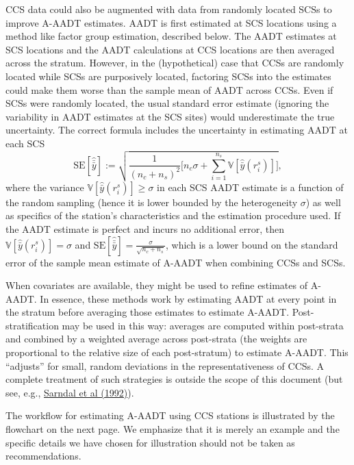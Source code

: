 \documentclass[11pt]{article}
\begin{document}
CCS data could also be augmented with data from randomly located SCSs to
improve A-AADT estimates. AADT is first estimated at SCS locations using
a method like factor group estimation, described below. The AADT
estimates at SCS locations and the AADT calculations at CCS locations
are then averaged across the stratum. However, in the (hypothetical)
case that CCSs are randomly located while SCSs are purposively located,
factoring SCSs into the estimates could make them worse than the sample
mean of AADT across CCSs. Even if SCSs were randomly located, the usual
standard error estimate (ignoring the variability in AADT estimates at
the SCS sites) would underestimate the true uncertainty. The correct
formula includes the uncertainty in estimating AADT at each SCS
\[\mbox{SE}[\hat{\bar{\bar{y}}}] := \sqrt{\frac{1}{(n_c + n_s)^2}\bigg [n_c \sigma + \sum_{i=1}^{n_s} \mathbb{V}[\hat{\bar{y}}(r_i^s)] \bigg ]},\]
where the variance \(\mathbb{V}[\hat{\bar{y}}(r_i^s)] \geq \sigma\) in
each SCS AADT estimate is a function of the random sampling (hence it is
lower bounded by the heterogeneity \(\sigma\)) as well as specifics of
the station's characteristics and the estimation procedure used. If the
AADT estimate is perfect and incurs no additional error, then
\(\mathbb{V}[\hat{\bar{y}}(r_i^s)] = \sigma\) and
\(\mbox{SE}[\hat{\bar{\bar{y}}}] = \frac{\sigma}{\sqrt{n_c + n_s}}\),
which is a lower bound on the standard error of the sample mean estimate
of A-AADT when combining CCSs and SCSs.

When covariates are available, they might be used to refine estimates of
A-AADT. In essence, these methods work by estimating AADT at every point
in the stratum before averaging those estimates to estimate A-AADT.
Post-stratification may be used in this way: averages are computed
within post-strata and combined by a weighted average across post-strata
(the weights are proportional to the relative size of each post-stratum)
to estimate A-AADT. This ``adjusts'' for small, random deviations in the
representativeness of CCSs. A complete treatment of such strategies is
outside the scope of this document (but see, e.g.,
\href{https://link.springer.com/book/9780387406206?utm_medium=referral&utm_source=google_books&utm_campaign=3_pier05_buy_print&utm_content=en_08082017}{Sarndal
et al (1992)}).


The workflow for estimating A-AADT using CCS stations is illustrated by the flowchart on the next page. 
We emphasize that it is merely an example and the specific details we have chosen for illustration should not be taken as recommendations.
\end{document}
